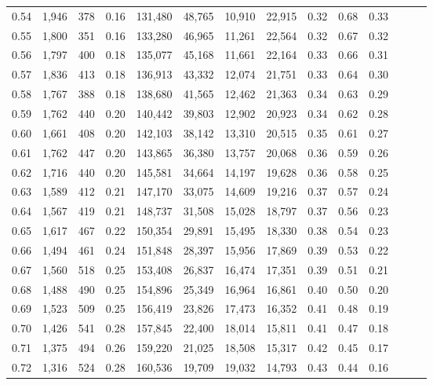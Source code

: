 \begin{tabular}{rrrrrrrrrrrrrr}
0.54 &  1,946 &  378 &  0.16 &  131,480 &   48,765 &  10,910 &  22,915 &  0.32 &  0.68 &      0.33 \\
0.55 &  1,800 &  351 &  0.16 &  133,280 &   46,965 &  11,261 &  22,564 &  0.32 &  0.67 &      0.32 \\
0.56 &  1,797 &  400 &  0.18 &  135,077 &   45,168 &  11,661 &  22,164 &  0.33 &  0.66 &      0.31 \\
0.57 &  1,836 &  413 &  0.18 &  136,913 &   43,332 &  12,074 &  21,751 &  0.33 &  0.64 &      0.30 \\
0.58 &  1,767 &  388 &  0.18 &  138,680 &   41,565 &  12,462 &  21,363 &  0.34 &  0.63 &      0.29 \\
0.59 &  1,762 &  440 &  0.20 &  140,442 &   39,803 &  12,902 &  20,923 &  0.34 &  0.62 &      0.28 \\
0.60 &  1,661 &  408 &  0.20 &  142,103 &   38,142 &  13,310 &  20,515 &  0.35 &  0.61 &      0.27 \\
0.61 &  1,762 &  447 &  0.20 &  143,865 &   36,380 &  13,757 &  20,068 &  0.36 &  0.59 &      0.26 \\
0.62 &  1,716 &  440 &  0.20 &  145,581 &   34,664 &  14,197 &  19,628 &  0.36 &  0.58 &      0.25 \\
0.63 &  1,589 &  412 &  0.21 &  147,170 &   33,075 &  14,609 &  19,216 &  0.37 &  0.57 &      0.24 \\
0.64 &  1,567 &  419 &  0.21 &  148,737 &   31,508 &  15,028 &  18,797 &  0.37 &  0.56 &      0.23 \\
0.65 &  1,617 &  467 &  0.22 &  150,354 &   29,891 &  15,495 &  18,330 &  0.38 &  0.54 &      0.23 \\
0.66 &  1,494 &  461 &  0.24 &  151,848 &   28,397 &  15,956 &  17,869 &  0.39 &  0.53 &      0.22 \\
0.67 &  1,560 &  518 &  0.25 &  153,408 &   26,837 &  16,474 &  17,351 &  0.39 &  0.51 &      0.21 \\
0.68 &  1,488 &  490 &  0.25 &  154,896 &   25,349 &  16,964 &  16,861 &  0.40 &  0.50 &      0.20 \\
0.69 &  1,523 &  509 &  0.25 &  156,419 &   23,826 &  17,473 &  16,352 &  0.41 &  0.48 &      0.19 \\
0.70 &  1,426 &  541 &  0.28 &  157,845 &   22,400 &  18,014 &  15,811 &  0.41 &  0.47 &      0.18 \\
0.71 &  1,375 &  494 &  0.26 &  159,220 &   21,025 &  18,508 &  15,317 &  0.42 &  0.45 &      0.17 \\
0.72 &  1,316 &  524 &  0.28 &  160,536 &   19,709 &  19,032 &  14,793 &  0.43 &  0.44 &      0.16 \\

\end{tabular}
